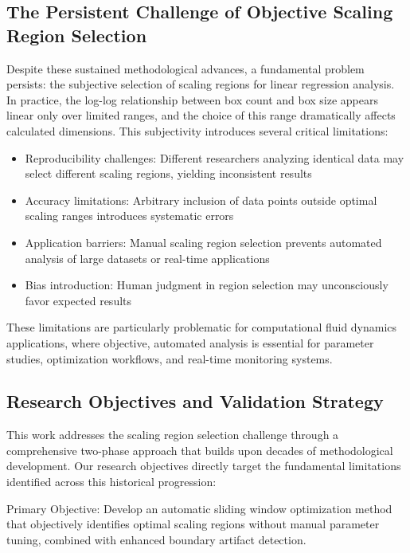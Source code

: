 \documentclass[preprint,12pt]{elsarticle}
\def\textbf#1{#1}%
\begin{document}
\subsection{The Persistent Challenge of Objective Scaling Region Selection}

Despite these sustained methodological advances, a fundamental problem persists: the subjective selection of scaling regions for linear regression analysis. In practice, the log-log relationship between box count and box size appears linear only over limited ranges, and the choice of this range dramatically affects calculated dimensions. This subjectivity introduces several critical limitations:

\begin{itemize}
\item \textbf{Reproducibility challenges}: Different researchers analyzing identical data may select different scaling regions, yielding inconsistent results
\item \textbf{Accuracy limitations}: Arbitrary inclusion of data points outside optimal scaling ranges introduces systematic errors
\item \textbf{Application barriers}: Manual scaling region selection prevents automated analysis of large datasets or real-time applications
\item \textbf{Bias introduction}: Human judgment in region selection may unconsciously favor expected results
\end{itemize}

These limitations are particularly problematic for computational fluid dynamics applications, where objective, automated analysis is essential for parameter studies, optimization workflows, and real-time monitoring systems.

\subsection{Research Objectives and Validation Strategy}

This work addresses the scaling region selection challenge through a comprehensive two-phase approach that builds upon decades of methodological development. Our research objectives directly target the fundamental limitations identified across this historical progression:

\textbf{Primary Objective}: Develop an automatic sliding window optimization method that objectively identifies optimal scaling regions without manual parameter tuning, combined with enhanced boundary artifact detection.
\end{document}
